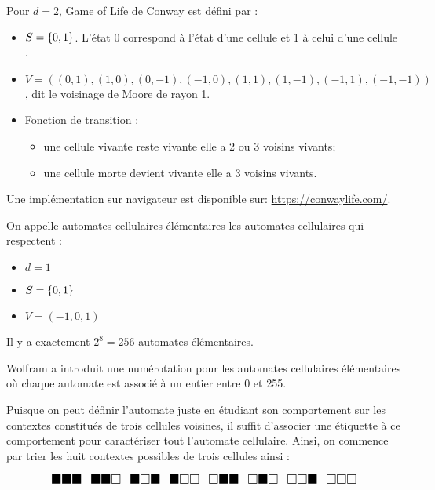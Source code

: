 \begin{exemple}
	Pour $d = 2$, Game of Life de Conway \cite{conwayGOL} est défini par :
	\begin{itemize}
		\item $S = \left\{0,1\right\}$. L'état 0 correspond à l'état d'une cellule  et 1 à celui d'une cellule .
		\item $V = ((0,1), (1,0), (0,-1), (-1,0), (1,1), (1,-1), (-1,1), (-1,-1))$, dit le voisinage de Moore de rayon 1.
		\item Fonction de transition :
		      \begin{itemize}
			      \item une cellule vivante reste vivante \ssi elle a 2 ou 3 voisins vivants;
			      \item une cellule morte devient vivante \ssi elle a 3 voisins vivants.
		      \end{itemize}
	\end{itemize}

	Une implémentation sur navigateur est disponible sur: \url{https://conwaylife.com/}.
\end{exemple}

\begin{definition}
	On appelle automates cellulaires élémentaires les automates cellulaires qui respectent :
	\begin{itemize}
		\item $d = 1$
		\item $S = \left\{0,1\right\}$
		\item $V = (-1,0,1)$
	\end{itemize}

	Il y a exactement $2^8 = 256$ automates élémentaires.
\end{definition}

	Wolfram a introduit une numérotation \cite{wolfgramClass} pour les automates cellulaires élémentaires où chaque automate
	est associé à un entier entre 0 et 255.

	Puisque on peut définir l'automate juste en étudiant son comportement sur les contextes constitués 
	de trois cellules voisines, il 	suffit d'associer une
	étiquette à ce comportement pour caractériser tout l'automate cellulaire. Ainsi, on commence par trier
	les huit contextes possibles de trois cellules ainsi :

	\[ \LARGE
		\substack{\blacksquare \blacksquare \blacksquare } \enspace
		\substack{\blacksquare \blacksquare \square } \enspace
		\substack{\blacksquare \square \blacksquare } \enspace
		\substack{\blacksquare \square \square } \enspace
		\substack{\square \blacksquare \blacksquare } \enspace
		\substack{\square \blacksquare \square } \enspace
		\substack{\square \square \blacksquare } \enspace
		\substack{\square \square \square }
	\]


